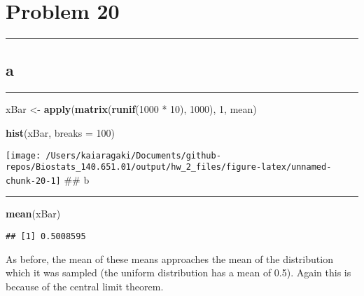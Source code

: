 \documentclass[]{tufte-handout}
\newenvironment{Shaded}{}{}
\newcommand{\DataTypeTok}[1]{\textcolor[rgb]{0.56,0.13,0.00}{#1}}
\newcommand{\DecValTok}[1]{\textcolor[rgb]{0.25,0.63,0.44}{#1}}
\newcommand{\KeywordTok}[1]{\textcolor[rgb]{0.00,0.44,0.13}{\textbf{#1}}}
\newcommand{\NormalTok}[1]{#1}
\newcommand{\OperatorTok}[1]{\textcolor[rgb]{0.40,0.40,0.40}{#1}}
\newcommand{\StringTok}[1]{\textcolor[rgb]{0.25,0.44,0.63}{#1}}
\begin{document}
\hypertarget{problem-20}{%
\section{Problem 20}\label{problem-20}}

\begin{center}\rule{0.5\linewidth}{0.5pt}\end{center}

\hypertarget{a-12}{%
\subsection{a}\label{a-12}}

\begin{center}\rule{0.5\linewidth}{0.5pt}\end{center}

\begin{Shaded}
\begin{Highlighting}[]
\NormalTok{xBar <-}\StringTok{ }\KeywordTok{apply}\NormalTok{(}\KeywordTok{matrix}\NormalTok{(}\KeywordTok{runif}\NormalTok{(}\DecValTok{1000} \OperatorTok{*}\StringTok{ }\DecValTok{10}\NormalTok{), }\DecValTok{1000}\NormalTok{), }\DecValTok{1}\NormalTok{, mean)}
\end{Highlighting}
\end{Shaded}

\begin{Shaded}
\begin{Highlighting}[]
\KeywordTok{hist}\NormalTok{(xBar, }\DataTypeTok{breaks =} \DecValTok{100}\NormalTok{)}
\end{Highlighting}
\end{Shaded}

\texttt{[image: /Users/kaiaragaki/Documents/github-repos/Biostats\_140.651.01/output/hw\_2\_files/figure-latex/unnamed-chunk-20-1]}
\#\# b

\begin{center}\rule{0.5\linewidth}{0.5pt}\end{center}

\begin{Shaded}
\begin{Highlighting}[]
\KeywordTok{mean}\NormalTok{(xBar)}
\end{Highlighting}
\end{Shaded}

\begin{verbatim}
## [1] 0.5008595
\end{verbatim}

As before, the mean of these means approaches the mean of the
distribution which it was sampled (the uniform distribution has a mean
of 0.5). Again this is because of the central limit theorem.
\end{document}
